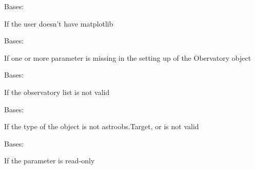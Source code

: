 \documentclass[letterpaper,10pt,english]{sphinxmanual}
\begin{document}

\begin{fulllineitems}
\label{astroobs:astroobs.astroobsexception.NoPlotMode}
Bases: 

If the user doesn't have matplotlib

\end{fulllineitems}


\begin{fulllineitems}
\label{astroobs:astroobs.astroobsexception.NonObservatory}
Bases: 

If one or more parameter is missing in the setting up of the Obervatory object

\end{fulllineitems}


\begin{fulllineitems}
\label{astroobs:astroobs.astroobsexception.NonObservatoryList}
Bases: 

If the observatory list is not valid

\end{fulllineitems}


\begin{fulllineitems}
\label{astroobs:astroobs.astroobsexception.NonTarget}
Bases: 

If the type of the object is not astroobs.Target, or is not valid

\end{fulllineitems}


\begin{fulllineitems}
\label{astroobs:astroobs.astroobsexception.ReadOnly}
Bases: 

If the parameter is read-only

\end{fulllineitems}
\end{document}
